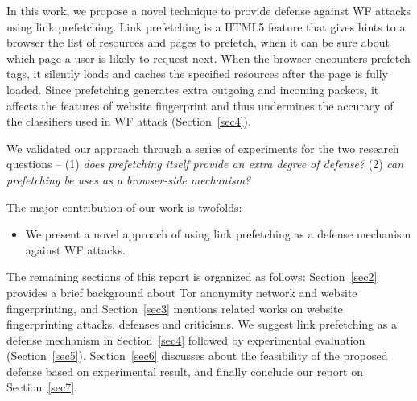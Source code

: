 In this work, we propose a novel technique to provide defense against WF attacks using link prefetching.
Link prefetching is a HTML5 feature that gives hints to a browser the list of resources and pages to prefetch, when it can be sure about which page a user is likely to request next.
When the browser encounters prefetch tags, it silently loads and caches the specified resources after the page is fully loaded.
Since prefetching generates extra outgoing and incoming packets, it affects the features of website fingerprint and thus undermines the accuracy of the classifiers used in WF attack (Section~\ref{sec4}).

We validated our approach through a series of experiments for the two research questions -- (1) {\it does prefetching itself provide an extra degree of defense?} (2) {\it can prefetching be uses as a browser-side mechanism?}


The major contribution of our work is twofolds:
\begin{itemize}
\item
We present a novel approach of using link prefetching as a defense mechanism against WF attacks.
\end{itemize}

The remaining sections of this report is organized as follows: Section~\ref{sec2} provides a brief background about Tor anonymity network and website fingerprinting, and Section~\ref{sec3} mentions related works on website fingerprinting attacks, defenses and criticisms.
We suggest link prefetching as a defense mechanism in Section~\ref{sec4} followed by experimental evaluation (Section~\ref{sec5}).
Section~\ref{sec6} discusses about the feasibility of the proposed defense based on experimental result, and finally conclude our report on Section~\ref{sec7}.

